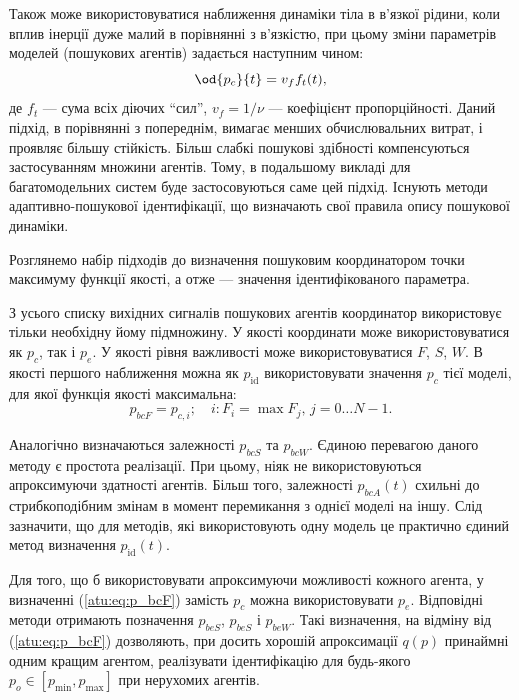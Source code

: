\documentclass[a4paper,13pt]{atuaref}
\begin{document}
Також може використовуватися наближення динаміки тіла в в'язкої рідини, коли
вплив інерції дуже малий в порівнянні з в'язкістю, при цьому зміни параметрів
моделей (пошукових агентів) задається наступним чином:
%
\begin{equation}
  \od{p_c}{t} = v_f f_t(t),
  \label{atu:eq:v_f}
\end{equation}
%
\noindent
де $ f_t $ --- сума всіх діючих ``сил'',
$ v_f = 1 / \nu $ --- коефіцієнт
пропорційності. Даний підхід, в порівнянні з попереднім, вимагає менших
обчислювальних витрат, і проявляє більшу стійкість. Більш слабкі пошукові
здібності компенсуються застосуванням множини агентів. Тому, в подальшому
викладі для багатомодельних систем буде застосовуються саме цей підхід.
Існують методи адаптивно-пошукової ідентифікації, що визначають свої правила опису пошукової динаміки.


Розглянемо набір підходів до визначення пошуковим координатором точки максимуму
функції якості, а отже --- значення ідентифікованого параметра.

З усього списку вихідних сигналів пошукових агентів координатор використовує
тільки необхідну йому підмножину. У якості координати може використовуватися як
$ p_c$, так і $ p_e $.
У якості рівня важливості може використовуватися $ F $, $ S $, $W$.
В якості першого наближення можна як $ p_\mathrm{id} $ використовувати
значення $ p_c $ тієї моделі, для якої функція якості максимальна:
%
\begin{equation}
  p_{bcF}
  =
  p_{c,i};
  \quad
  i : F_i = \max{F_j}, \, j=0 \ldots N-1 .
  \label{atu:eq:p_bcF}
\end{equation}

Аналогічно визначаються залежності
$p_{bcS}$ та $p_{bcW}$.
Єдиною перевагою даного методу є простота реалізації. При цьому, ніяк не
використовуються апроксимуючи здатності агентів. Більш того, залежності
$ p_{bcA} (t) $ схильні до стрибкоподібним змінам в момент перемикання з однієї моделі
на іншу. Слід зазначити, що для методів, які використовують одну модель це
практично єдиний метод визначення
$p_\mathrm{id}(t)$.

Для того, що б використовувати апроксимуючи можливості кожного агента, у
визначенні (\ref{atu:eq:p_bcF}) замість $ p_c $ можна використовувати $ p_e$.
Відповідні методи отримають позначення $ p_ {beS} $, $ p_ {beS} $ і $ p_{beW} $.
Такі визначення, на відміну від (\ref{atu:eq:p_bcF}) дозволяють,
при досить хорошій апроксимації $ q (p) $ принаймні одним кращим агентом,
реалізувати ідентифікацію для будь-якого
$ p_o \in [p_{\min} , p_{\max}]$ при нерухомих агентів.
\end{document}
